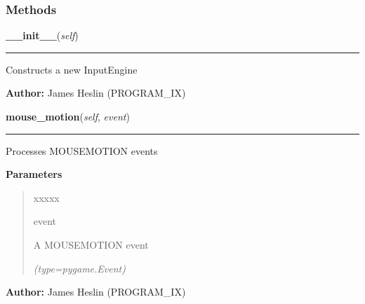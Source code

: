   \subsubsection{Methods}

    \label{pystroke:input_engine:InputEngine:__init__}

    \vspace{0.5ex}

\hspace{.8\funcindent}\begin{boxedminipage}{\funcwidth}

    \raggedright \textbf{\_\_init\_\_}(\textit{self})

    \vspace{-1.5ex}

    \rule{\textwidth}{0.5\fboxrule}
\setlength{\parskip}{2ex}
    Constructs a new InputEngine

\setlength{\parskip}{1ex}
\textbf{Author:} James Heslin (PROGRAM\_IX)



    \end{boxedminipage}

    \label{pystroke:input_engine:InputEngine:mouse_motion}

    \vspace{0.5ex}

\hspace{.8\funcindent}\begin{boxedminipage}{\funcwidth}

    \raggedright \textbf{mouse\_motion}(\textit{self}, \textit{event})

    \vspace{-1.5ex}

    \rule{\textwidth}{0.5\fboxrule}
\setlength{\parskip}{2ex}
    Processes MOUSEMOTION events

\setlength{\parskip}{1ex}
      \textbf{Parameters}
      \vspace{-1ex}

      \begin{quote}
        \begin{Ventry}{xxxxx}

          \item[event]

          A MOUSEMOTION event

            {\it (type=pygame.Event)}

        \end{Ventry}

      \end{quote}

\textbf{Author:} James Heslin (PROGRAM\_IX)



    \end{boxedminipage}

